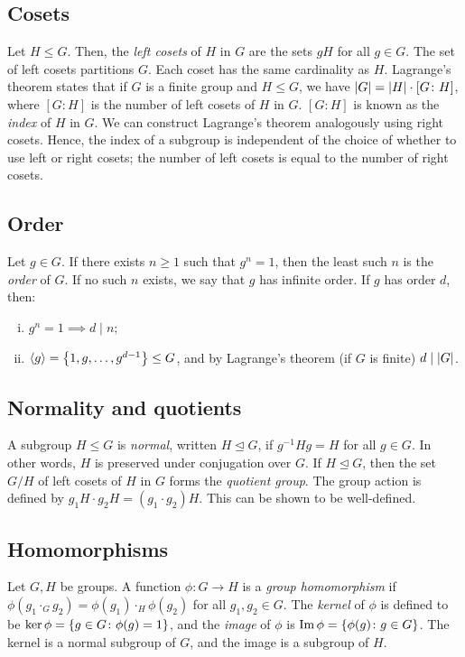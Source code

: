 \subsection{Cosets}
Let \( H \leq G \).
Then, the \textit{left cosets} of \( H \) in \( G \) are the sets \( gH \) for all \( g \in G \).
The set of left cosets partitions \( G \).
Each coset has the same cardinality as \( H \).
Lagrange's theorem states that if \( G \) is a finite group and \( H \leq G \), we have \( \abs{G} = \abs{H} \cdot [G \colon H] \), where \( [G \colon H] \) is the number of left cosets of \( H \) in \( G \).
\( [G \colon H] \) is known as the \textit{index} of \( H \) in \( G \).
We can construct Lagrange's theorem analogously using right cosets.
Hence, the index of a subgroup is independent of the choice of whether to use left or right cosets; the number of left cosets is equal to the number of right cosets.

\subsection{Order}
Let \( g \in G \).
If there exists \( n \geq 1 \) such that \( g^n = 1 \), then the least such \( n \) is the \textit{order} of \( G \).
If no such \( n \) exists, we say that \( g \) has infinite order.
If \( g \) has order \( d \), then:
\begin{enumerate}[(i)]
	\item \( g^n = 1 \implies d \mid n \);
	\item \( \langle{} g \rangle = \qty{1, g, \dots, g^{d-1}} \leq G \), and by Lagrange's theorem (if \( G \) is finite) \( d \mid \abs{G} \).
\end{enumerate}

\subsection{Normality and quotients}
A subgroup \( H \leq G \) is \textit{normal}, written \( H \trianglelefteq G \), if \( g^{-1} H g = H \) for all \( g \in G \).
In other words, \( H \) is preserved under conjugation over \( G \).
If \( H \trianglelefteq G \), then the set \( G/H \) of left cosets of \( H \) in \( G \) forms the \textit{quotient group}.
The group action is defined by \( g_1 H \cdot g_2 H = (g_1 \cdot g_2) H \).
This can be shown to be well-defined.

\subsection{Homomorphisms}
Let \( G, H \) be groups.
A function \( \phi \colon G \to H \) is a \textit{group homomorphism} if \( \phi(g_1 \cdot_G g_2) = \phi(g_1) \cdot_H \phi(g_2) \) for all \( g_1, g_2 \in G \).
The \textit{kernel} of \( \phi \) is defined to be \( \ker \phi = \qty{g \in G \colon \phi(g) = 1} \), and the \textit{image} of \( \phi \) is \( \Im \phi = \qty{\phi(g) \colon g \in G} \).
The kernel is a normal subgroup of \( G \), and the image is a subgroup of \( H \).

